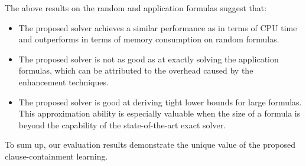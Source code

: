 The above results on the random and application formulas suggest that:
\begin{itemize}
    \item The proposed solver \erssat achieves a similar performance as \dcssat in terms of CPU time and outperforms \dcssat in terms of memory consumption on random formulas.
    \item The proposed solver \erssat is not as good as \dcssat at exactly solving the application formulas, which can be attributed to the overhead caused by the enhancement techniques.
    \item The proposed solver \erssat is good at deriving tight lower bounds for large formulas. This approximation ability is especially valuable when the size of a formula is beyond the capability of the state-of-the-art exact solver.
\end{itemize}
To sum up, our evaluation results demonstrate the unique value of the proposed clause-containment learning.
